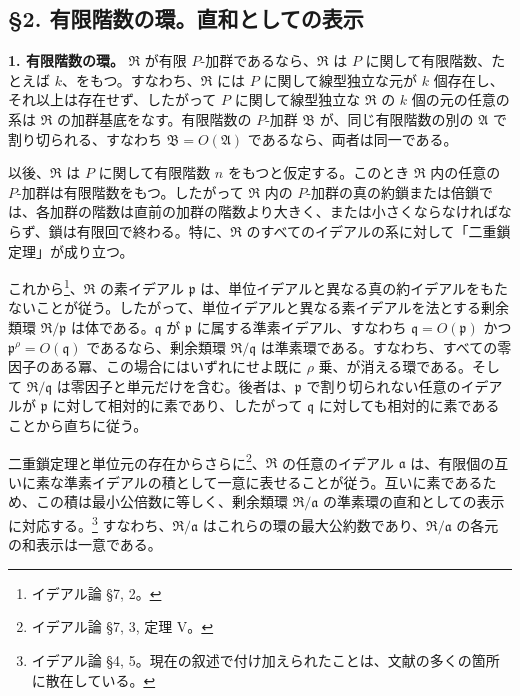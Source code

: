 \documentclass[11pt]{article}
\begin{document}
\subsection*{\S 2. 有限階数の環。直和としての表示}

\textbf{1. 有限階数の環。} $\mathfrak R$ が有限 $P$-加群であるなら、$\mathfrak R$ は $P$ に関して有限階数、たとえば $k$、をもつ。すなわち、$\mathfrak R$ には $P$ に関して線型独立な元が $k$ 個存在し、それ以上は存在せず、したがって $P$ に関して線型独立な $\mathfrak R$ の $k$ 個の元の任意の系は $\mathfrak R$ の加群基底をなす。有限階数の $P$-加群 $\mathfrak B$ が、同じ有限階数の別の $\mathfrak A$ で割り切られる、すなわち $\mathfrak B=O(\mathfrak A)$ であるなら、両者は同一である。

以後、$\mathfrak R$ は $P$ に関して有限階数 $n$ をもつと仮定する。このとき $\mathfrak R$ 内の任意の $P$-加群は有限階数をもつ。したがって $\mathfrak R$ 内の $P$-加群の真の約鎖または倍鎖では、各加群の階数は直前の加群の階数より大きく、または小さくならなければならず、鎖は有限回で終わる。特に、$\mathfrak R$ のすべてのイデアルの系に対して「二重鎖定理」が成り立つ。

これから\footnote{イデアル論 \S 7, 2。}、$\mathfrak R$ の素イデアル $\mathfrak p$ は、単位イデアルと異なる真の約イデアルをもたないことが従う。したがって、単位イデアルと異なる素イデアルを法とする剰余類環 $\mathfrak R/\mathfrak p$ は体である。$\mathfrak q$ が $\mathfrak p$ に属する準素イデアル、すなわち $\mathfrak q=O(\mathfrak p)$ かつ $\mathfrak p^{\rho}=O(\mathfrak q)$ であるなら、剰余類環 $\mathfrak R/\mathfrak q$ は準素環である。すなわち、すべての零因子のある冪、この場合にはいずれにせよ既に $\rho$ 乗、が消える環である。そして $\mathfrak R/\mathfrak q$ は零因子と単元だけを含む。後者は、$\mathfrak p$ で割り切られない任意のイデアルが $\mathfrak p$ に対して相対的に素であり、したがって $\mathfrak q$ に対しても相対的に素であることから直ちに従う。

二重鎖定理と単位元の存在からさらに\footnote{イデアル論 \S 7, 3, 定理 V。}、$\mathfrak R$ の任意のイデアル $\mathfrak a$ は、有限個の互いに素な準素イデアルの積として一意に表せることが従う。互いに素であるため、この積は最小公倍数に等しく、剰余類環 $\mathfrak R/\mathfrak a$ の準素環の直和としての表示に対応する。\footnote{イデアル論 \S 4, 5。現在の叙述で付け加えられたことは、文献の多くの箇所に散在している。} すなわち、$\mathfrak R/\mathfrak a$ はこれらの環の最大公約数であり、$\mathfrak R/\mathfrak a$ の各元の和表示は一意である。
\end{document}
